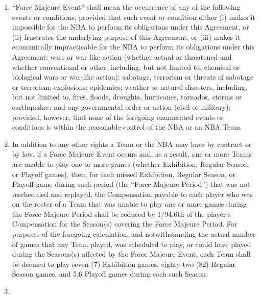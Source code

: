 \documentclass[
]{book}
\providecommand{\tightlist}{%
  \setlength{\itemsep}{0pt}\setlength{\parskip}{0pt}}
\begin{document}
\begin{enumerate}
\def\labelenumi{(\alph{enumi})}
\tightlist
\item
  ``Force Majeure Event'' shall mean the occurrence of any of the following events or conditions, provided that such event or condition either (i) makes it impossible for the NBA to perform its obligations under this Agreement, or (ii) frustrates the underlying purpose of this Agreement, or (iii) makes it economically impracticable for the NBA to perform its obligations under this Agreement: wars or war-like action (whether actual or threatened and whether conventional or other, including, but not limited to, chemical or biological wars or war-like action); sabotage, terrorism or threats of sabotage or terrorism; explosions; epidemics; weather or natural disasters, including, but not limited to, fires, floods, droughts, hurricanes, tornados, storms or earthquakes; and any governmental order or action (civil or military); provided, however, that none of the foregoing enumerated events or conditions is within the reasonable control of the NBA or an NBA Team.
\item
  In addition to any other rights a Team or the NBA may have by contract or by law, if a Force Majeure Event occurs and, as a result, one or more Teams are unable to play one or more games (whether Exhibition, Regular Season, or Playoff games), then, for each missed Exhibition, Regular Season, or Playoff game during such period (the ``Force Majeure Period'') that was not rescheduled and replayed, the Compensation payable to each player who was on the roster of a Team that was unable to play one or more games during the Force Majeure Period shall be reduced by 1/94.6th of the player's Compensation for the Season(s) covering the Force Majeure Period. For purposes of the foregoing calculation, and notwithstanding the actual number of games that any Team played, was scheduled to play, or could have played during the Seasons(s) affected by the Force Majeure Event, each Team shall be deemed to play seven (7) Exhibition games, eighty-two (82) Regular Season games, and 5.6 Playoff games during each such Season.
\item

\end{enumerate}
\end{document}

